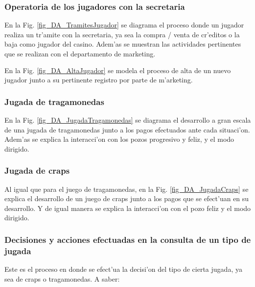 \subsubsection{Operatoria de los jugadores con la secretaria}
En la Fig. \ref{fig_DA_TramitesJugador} se diagrama el proceso donde un jugador realiza un tr'amite con la secretaria, ya sea la compra / venta de cr'editos o la baja como jugador del casino. Adem'as se muestran las actividades pertinentes que se realizan con el departamento de marketing. 


\clearpage

En la Fig. \ref{fig_DA_AltaJugador} se modela el proceso de alta de un nuevo jugador junto a su pertinente registro por parte de m'arketing.



\clearpage




\subsubsection{Jugada de tragamonedas}
En la Fig. \ref{fig_DA_JugadaTragamonedas} se diagrama el desarrollo a gran escala de una jugada de tragamonedas junto a los pagos efectuados ante cada situaci'on. Adem'as se explica la interacci'on con los pozos progresivo y feliz, y el modo dirigido.


\clearpage





\subsubsection{Jugada de craps}
Al igual que para el juego de tragamonedas, en la Fig. \ref{fig_DA_JugadaCraps} se explica el desarrollo de un juego de craps junto a los pagos que se efect'uan en su desarrollo. Y de igual manera se explica la interacci'on con el pozo feliz y el modo dirigido.


\clearpage





\subsubsection{Decisiones y acciones efectuadas en la consulta de un tipo de jugada}
Este es el proceso en donde se efect'ua la decisi'on del tipo de cierta jugada, ya sea de craps o tragamonedas. A saber:

